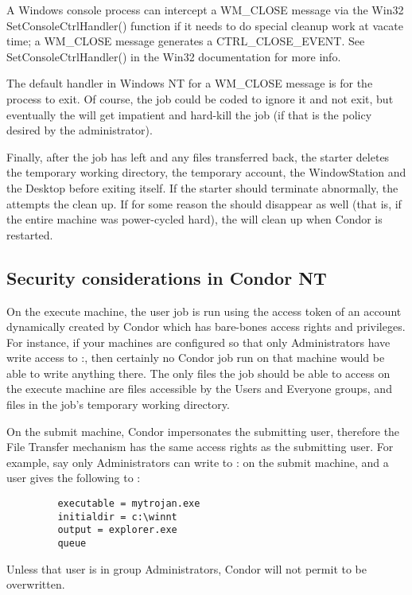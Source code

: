 \Note A Windows console process can intercept a WM\_CLOSE message
via the Win32 SetConsoleCtrlHandler() function if it needs to do special
cleanup work at vacate time; a WM\_CLOSE message
generates a CTRL\_CLOSE\_EVENT.  See SetConsoleCtrlHandler() in the Win32
documentation for more info.

\Note The default handler in Windows NT for a WM\_CLOSE message is for the
process to exit.  Of course, the job could be coded to ignore it and not
exit, but eventually the  will get impatient and hard-kill
the job (if that is the policy desired by the administrator).

Finally, after the job has left and any files transferred back,
the starter
deletes the temporary working directory, the temporary
account, the WindowStation and the Desktop before exiting itself.
If the starter should terminate abnormally, the 
attempts the clean up.
If for some reason the  should disappear as well
(that is, if the entire machine was power-cycled hard),
the  will clean up when Condor is restarted.

\subsection{Security considerations in Condor NT}


On the execute machine, the user job is run using the access token of an
account dynamically created by Condor which has bare-bones access rights and
privileges.  For instance, if your machines are configured so that only
Administrators have write access to
\verb@C:\WINNT@,
then certainly no
Condor job run on that machine would be able to write anything there.
The only files the job should be able to access on the execute machine
are files accessible by the Users and Everyone groups, and files in the
job's temporary working directory.

On the submit machine, Condor impersonates the submitting user, therefore
the File Transfer mechanism has the same access rights as the submitting
user.  For example, say only Administrators can write to
\verb@C:\WINNT@
on the submit machine,
and a user gives the following to  :
\begin{verbatim}
         executable = mytrojan.exe
         initialdir = c:\winnt
         output = explorer.exe
         queue
\end{verbatim}
Unless that user is in group Administrators, Condor will not permit
 to be overwritten.  

